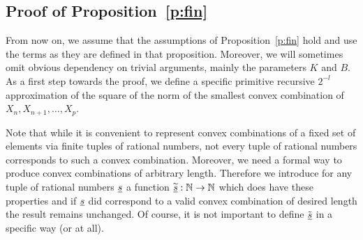 \subsection{Proof of Proposition~\ref{p:fin}}\label{s:proof}

From now on, we assume that the assumptions of Proposition~\ref{p:fin} hold and use the terms as they are defined in that proposition. 
Moreover, we will sometimes omit obvious dependency on trivial arguments, mainly the parameters $K$ and $B$.\\
As a first step towards the proof, we define a specific primitive recursive $2^{-l}$ approximation of the square of the norm of the smallest 
convex combination of $X_n, X_{n+1}, \ldots, X_p$. 
\begin{rmk}
Note that while it is convenient to represent convex combinations of a fixed set of elements via finite tuples of
rational numbers, not every tuple of rational numbers corresponds to such a convex combination. Moreover, we need a formal way to produce convex combinations
of arbitrary length. Therefore we introduce for any tuple of rational numbers $\underline s$ a function $\widetilde{\underline s}:\mathbb{N}\to\mathbb{N}$ which does have these properties and
if $\underline s$ did correspond to a valid convex combination of desired length the result remains unchanged. Of course, it is not important to define
$\tilde{\underline s}$ in a specific way (or at all).
\end{rmk}

